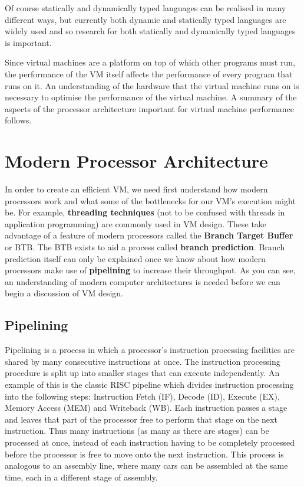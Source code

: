 \documentclass[english,a4paper,12pt]{report}
\begin{document}
Of course statically and dynamically typed languages can be realised
in many different ways, but currently both dynamic and statically
typed languages are widely used and so research for both statically
and dynamically typed languages is important.

Since virtual machines are a platform on top of which other programs
must run, the performance of the VM itself affects the performance of
every program that runs on it. An understanding of the hardware that
the virtual machine runs on is necessary to optimise the performance
of the virtual machine. A summary of the aspects of the processor
architecture important for virtual machine performance follows.

\section{Modern Processor Architecture}
\label{sec:processor_architecture}

In order to create an efficient VM, we need first understand how
modern processors work and what some of the bottlenecks for our VM's
execution might be. For example, \textbf{threading techniques} (not to
be confused with threads in application programming) are commonly used
in VM design. These take advantage of a feature of modern processors
called the \textbf{Branch Target Buffer} or BTB. The BTB exists to aid
a process called \textbf{branch prediction}. Branch prediction itself
can only be explained once we know about how modern processors make
use of \textbf{pipelining} to increase their throughput. As you can
see, an understanding of modern computer architectures is needed
before we can begin a discussion of VM design.

\subsection{Pipelining}

Pipelining is a process in which a processor's instruction processing
facilities are shared by many consecutive instructions at once. The
instruction processing procedure is split up into smaller stages that
can execute independently. An example of this is the classic RISC
pipeline which divides instruction processing into the following
steps: Instruction Fetch (IF), Decode (ID), Execute (EX), Memory Access
(MEM) and Writeback (WB). Each instruction passes a stage and leaves
that part of the processor free to perform that stage on the next
instruction. Thus many instructions (as many as there are stages) can
be processed at once, instead of each instruction having to be
completely processed before the processor is free to move onto the
next instruction. This process is analogous to an assembly line, where
many cars can be assembled at the same time, each in a different stage
of assembly.
\end{document}
